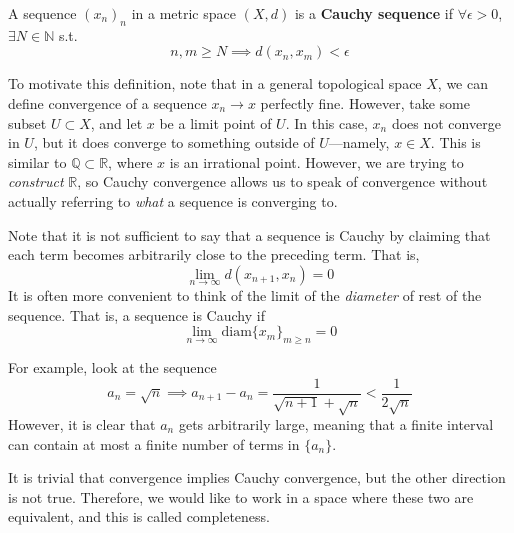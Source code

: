   \begin{definition}
    A sequence $(x_n)_n$ in a metric space $(X, d)$ is a \textbf{Cauchy sequence} if $\forall \epsilon > 0$, $\exists N \in \mathbb{N}$ s.t.  
    \begin{equation}
      n, m \geq N \implies d(x_n, x_m) < \epsilon
    \end{equation}
  \end{definition}

  To motivate this definition, note that in a general topological space $X$, we can define convergence of a sequence $x_n \to x$ perfectly fine. However, take some subset $U \subset X$, and let $x$ be a limit point of $U$. In this case, $x_n$ does not converge in $U$, but it does converge to something outside of $U$---namely, $x \in X$. This is similar to $\mathbb{Q} \subset \mathbb{R}$, where $x$ is an irrational point. However, we are trying to \textit{construct} $\mathbb{R}$, so Cauchy convergence allows us to speak of convergence without actually referring to \textit{what} a sequence is converging to. 

  Note that it is not sufficient to say that a sequence is Cauchy by claiming that each term becomes arbitrarily close to the preceding term. That is, 
  \begin{equation}
    \lim_{n \rightarrow \infty} d(x_{n+1}, x_{n}) = 0
  \end{equation}
  It is often more convenient to think of the limit of the \textit{diameter} of rest of the sequence. That is, a sequence is Cauchy if 
  \begin{equation}
    \lim_{n \rightarrow \infty} \mathrm{diam}\{x_{m}\}_{m \geq n} = 0
  \end{equation}

  \begin{example}
    For example, look at the sequence 
    \begin{equation}
      a_n = \sqrt{n} \implies a_{n+1} - a_{n} = \frac{1}{\sqrt{n+1} + \sqrt{n}} < \frac{1}{2\sqrt{n}}
    \end{equation}
    However, it is clear that $a_n$ gets arbitrarily large, meaning that a finite interval can contain at most a finite number of terms in $\{a_n\}$. 
  \end{example}

  It is trivial that convergence implies Cauchy convergence, but the other direction is not true. Therefore, we would like to work in a space where these two are equivalent, and this is called completeness. 

